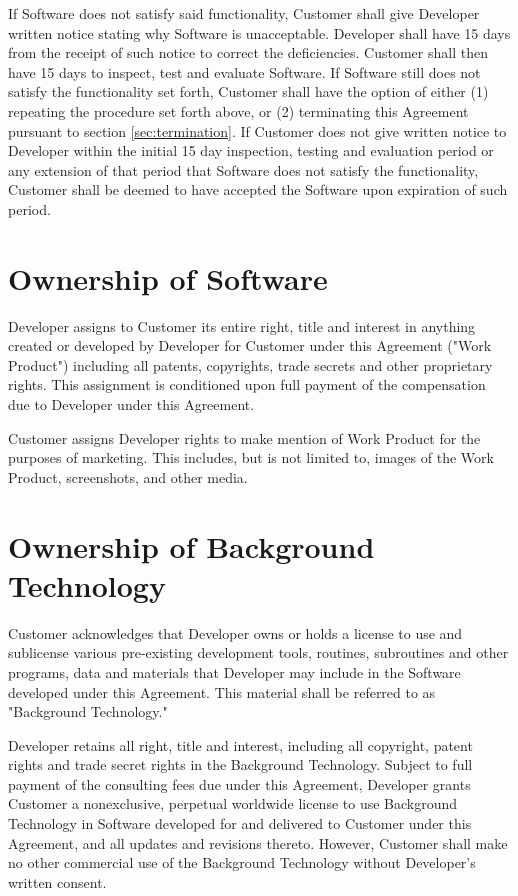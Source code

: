 \documentclass[11pt]{article}
\begin{document}
If Software does not satisfy said functionality, Customer shall give Developer written notice stating why Software is unacceptable. Developer shall have 15 days from the receipt of such notice to correct the deficiencies. Customer shall then have 15 days to inspect, test and evaluate Software. If Software still does not satisfy the functionality set forth, Customer shall have the option of either (1) repeating the procedure set forth above, or (2) terminating this Agreement pursuant to section \ref{sec:termination}. If Customer does not give written notice to Developer within the initial 15 day inspection, testing and evaluation period or any extension of that period that Software does not satisfy the functionality, Customer shall be deemed to have accepted the Software upon expiration of such period.
\section{Ownership of Software}
Developer assigns to Customer its entire right, title and interest in anything created or developed by Developer for Customer under this Agreement ("Work Product") including all patents, copyrights, trade secrets and other proprietary rights. This assignment is conditioned upon full payment of the compensation due to Developer under this Agreement. 

Customer assigns Developer rights to make mention of Work Product for the purposes of marketing. This includes, but is not limited to, images of the Work Product, screenshots, and other media.
\section{Ownership of Background Technology}
Customer acknowledges that Developer owns or holds a license to use and sublicense various pre-existing development tools, routines, subroutines and other programs, data and materials that Developer may include in the Software developed under this Agreement. This material shall be referred to as "Background Technology."  

Developer retains all right, title and interest, including all copyright, patent rights and trade secret rights in the Background Technology. Subject to full payment of the consulting fees due under this Agreement, Developer grants Customer a nonexclusive, perpetual worldwide license to use Background Technology in Software developed for and delivered to Customer under this Agreement, and all updates and revisions thereto. However, Customer shall make no other commercial use of the Background Technology without Developer’s written consent.
\end{document}
